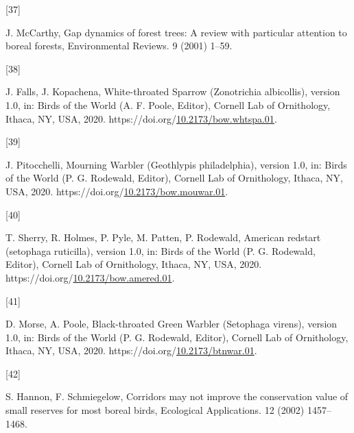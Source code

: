 \documentclass[manuscript, 3p, authoryear]{elsarticle} %
\newlength{\cslhangindent}
\newlength{\csllabelwidth}
\newlength{\cslentryspacingunit} %
\newenvironment{CSLReferences}[2] %
 {%
  \setlength{\parindent}{0pt}
  \ifodd #1
  \let\oldpar\par
  \def\par{\hangindent=\cslhangindent\oldpar}
  \fi
  \setlength{\parskip}{#2\cslentryspacingunit}
 }%
 {}
\newcommand{\CSLLeftMargin}[1]{\parbox[t]{\csllabelwidth}{#1}}
\newcommand{\CSLRightInline}[1]{\parbox[t]{\linewidth - \csllabelwidth}{#1}\break}
\begin{document}
\begin{CSLReferences}{0}{0}
\leavevmode{}%
\CSLLeftMargin{{[}37{]} }%
\CSLRightInline{J. McCarthy, Gap dynamics of forest trees: A review with particular attention to boreal forests, Environmental Reviews. 9 (2001) 1--59.}

\leavevmode{}%
\CSLLeftMargin{{[}38{]} }%
\CSLRightInline{J. Falls, J. Kopachena, White-throated {Sparrow} ({Zonotrichia} albicollis), version 1.0, in: Birds of the {World} ({A}. {F}. {Poole}, {Editor}), {Cornell Lab of Ornithology}, {Ithaca, NY, USA}, 2020. https://doi.org/\href{https://doi.org/10.2173/bow.whtspa.01}{10.2173/bow.whtspa.01}.}

\leavevmode{}%
\CSLLeftMargin{{[}39{]} }%
\CSLRightInline{J. Pitocchelli, Mourning {Warbler} ({Geothlypis} philadelphia), version 1.0, in: Birds of the {World} ({P}. {G}. {Rodewald}, {Editor}), {Cornell Lab of Ornithology}, {Ithaca, NY, USA}, 2020. https://doi.org/\href{https://doi.org/10.2173/bow.mouwar.01}{10.2173/bow.mouwar.01}.}

\leavevmode{}%
\CSLLeftMargin{{[}40{]} }%
\CSLRightInline{T. Sherry, R. Holmes, P. Pyle, M. Patten, P. Rodewald, American redstart (setophaga ruticilla), version 1.0, in: Birds of the {World} ({P}. {G}. {Rodewald}, {Editor}), {Cornell Lab of Ornithology}, {Ithaca, NY, USA}, 2020. https://doi.org/\href{https://doi.org/10.2173/bow.amered.01}{10.2173/bow.amered.01}.}

\leavevmode{}%
\CSLLeftMargin{{[}41{]} }%
\CSLRightInline{D. Morse, A. Poole, Black-throated {Green Warbler} ({Setophaga} virens), version 1.0, in: Birds of the {World} ({P}. {G}. {Rodewald}, {Editor}), {Cornell Lab of Ornithology}, {Ithaca, NY, USA}, 2020. https://doi.org/\href{https://doi.org/10.2173/btnwar.01}{10.2173/btnwar.01}.}

\leavevmode{}%
\CSLLeftMargin{{[}42{]} }%
\CSLRightInline{S. Hannon, F. Schmiegelow, Corridors may not improve the conservation value of small reserves for most boreal birds, Ecological Applications. 12 (2002) 1457--1468.}

\end{CSLReferences}

\pagebreak
\end{document}
